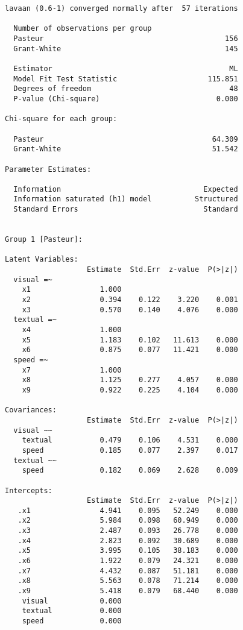 \begin{verbatim}
lavaan (0.6-1) converged normally after  57 iterations

  Number of observations per group         
  Pasteur                                          156
  Grant-White                                      145

  Estimator                                         ML
  Model Fit Test Statistic                     115.851
  Degrees of freedom                                48
  P-value (Chi-square)                           0.000

Chi-square for each group:

  Pasteur                                       64.309
  Grant-White                                   51.542

Parameter Estimates:

  Information                                 Expected
  Information saturated (h1) model          Structured
  Standard Errors                             Standard


Group 1 [Pasteur]:

Latent Variables:
                   Estimate  Std.Err  z-value  P(>|z|)
  visual =~                                           
    x1                1.000                           
    x2                0.394    0.122    3.220    0.001
    x3                0.570    0.140    4.076    0.000
  textual =~                                          
    x4                1.000                           
    x5                1.183    0.102   11.613    0.000
    x6                0.875    0.077   11.421    0.000
  speed =~                                            
    x7                1.000                           
    x8                1.125    0.277    4.057    0.000
    x9                0.922    0.225    4.104    0.000

Covariances:
                   Estimate  Std.Err  z-value  P(>|z|)
  visual ~~                                           
    textual           0.479    0.106    4.531    0.000
    speed             0.185    0.077    2.397    0.017
  textual ~~                                          
    speed             0.182    0.069    2.628    0.009

Intercepts:
                   Estimate  Std.Err  z-value  P(>|z|)
   .x1                4.941    0.095   52.249    0.000
   .x2                5.984    0.098   60.949    0.000
   .x3                2.487    0.093   26.778    0.000
   .x4                2.823    0.092   30.689    0.000
   .x5                3.995    0.105   38.183    0.000
   .x6                1.922    0.079   24.321    0.000
   .x7                4.432    0.087   51.181    0.000
   .x8                5.563    0.078   71.214    0.000
   .x9                5.418    0.079   68.440    0.000
    visual            0.000                           
    textual           0.000                           
    speed             0.000                           


\end{verbatim}
